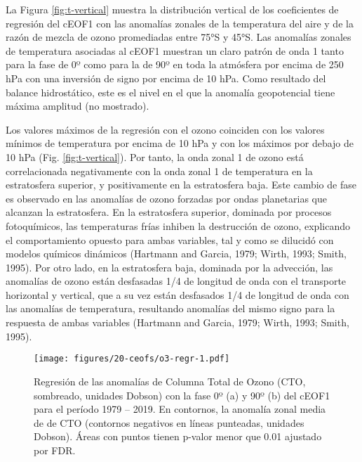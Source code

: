 \documentclass[12pt,oneside]{reedthesis}
\begin{document}
La Figura \ref{fig:t-vertical} muestra la distribución vertical de los coeficientes de regresión del cEOF1 con las anomalías zonales de la temperatura del aire y de la razón de mezcla de ozono promediadas entre 75°S y 45°S.
Las anomalías zonales de temperatura asociadas al cEOF1 muestran un claro patrón de onda 1 tanto para la fase de 0º como para la de 90º en toda la atmósfera por encima de 250 hPa con una inversión de signo por encima de 10 hPa.
Como resultado del balance hidrostático, este es el nivel en el que la anomalía geopotencial tiene máxima amplitud (no mostrado).

Los valores máximos de la regresión con el ozono coinciden con los valores mínimos de temperatura por encima de 10 hPa y con los máximos por debajo de 10 hPa (Fig. \ref{fig:t-vertical}).
Por tanto, la onda zonal 1 de ozono está correlacionada negativamente con la onda zonal 1 de temperatura en la estratosfera superior, y positivamente en la estratosfera baja.
Este cambio de fase es observado en las anomalías de ozono forzadas por ondas planetarias que alcanzan la estratosfera.
En la estratosfera superior, dominada por procesos fotoquímicos, las temperaturas frías inhiben la destrucción de ozono, explicando el comportamiento opuesto para ambas variables, tal y como se dilucidó con modelos químicos dinámicos (Hartmann and Garcia, 1979; Wirth, 1993; Smith, 1995).
Por otro lado, en la estratosfera baja, dominada por la advección, las anomalías de ozono están desfasadas 1/4 de longitud de onda con el transporte horizontal y vertical, que a su vez están desfasados 1/4 de longitud de onda con las anomalías de temperatura, resultando anomalías del mismo signo para la respuesta de ambas variables (Hartmann and Garcia, 1979; Wirth, 1993; Smith, 1995).




\begin{figure}
\centering
\texttt{[image: figures/20-ceofs/o3-regr-1.pdf]}
\caption{\label{fig:o3-regr}Regresión de las anomalías de Columna Total de Ozono (CTO, sombreado, unidades Dobson) con la fase 0º (a) y 90º (b) del cEOF1 para el período 1979 -- 2019.
En contornos, la anomalía zonal media de de CTO (contornos negativos en líneas punteadas, unidades Dobson).
Áreas con puntos tienen p-valor menor que 0.01 ajustado por FDR.}
\end{figure}
\end{document}
